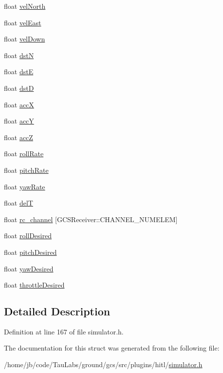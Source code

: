 \begin{DoxyCompactItemize}
\item 
float \hyperlink{group___h_i_t_l_plugin_gaa20e34957a2badaea5d07a49ab029182}{vel\-North}
\item 
float \hyperlink{group___h_i_t_l_plugin_gae7889fb60f991558b83af5aef685a35f}{vel\-East}
\item 
float \hyperlink{group___h_i_t_l_plugin_ga9d5ac871d0c0845dcd9363069268c2d3}{vel\-Down}
\item 
float \hyperlink{group___h_i_t_l_plugin_gad276a9a114b2d57a5c4536e9ef0a9a12}{dst\-N}
\item 
float \hyperlink{group___h_i_t_l_plugin_ga5d4746c1f8dd9251dd5b37ced82d4a93}{dst\-E}
\item 
float \hyperlink{group___h_i_t_l_plugin_gaf1362ebbee3efc97a9c205aaffdeb98a}{dst\-D}
\item 
float \hyperlink{group___h_i_t_l_plugin_gaf15a299d1ff6f64a04c72d9ef5bf3860}{acc\-X}
\item 
float \hyperlink{group___h_i_t_l_plugin_ga3ce16295c4d5bfc0a4938f0120d946c4}{acc\-Y}
\item 
float \hyperlink{group___h_i_t_l_plugin_ga8565b780814dd8fddf28e4018256356a}{acc\-Z}
\item 
float \hyperlink{group___h_i_t_l_plugin_ga81680dc2663395de5b3f4aeaeb9f35f9}{roll\-Rate}
\item 
float \hyperlink{group___h_i_t_l_plugin_ga9d3248d73390ba0b13ca165ee1f1fef0}{pitch\-Rate}
\item 
float \hyperlink{group___h_i_t_l_plugin_gab54300de73ca6f11f519068435673210}{yaw\-Rate}
\item 
float \hyperlink{group___h_i_t_l_plugin_gadbdb09f62a5ce0e914e8551ce3bd0bbd}{del\-T}
\item 
float \hyperlink{group___h_i_t_l_plugin_gadf58977eef899196280267ae39cc6f65}{rc\-\_\-channel} \mbox{[}\-G\-C\-S\-Receiver\-::\-C\-H\-A\-N\-N\-E\-L\-\_\-\-N\-U\-M\-E\-L\-E\-M\mbox{]}
\item 
float \hyperlink{group___h_i_t_l_plugin_ga56fde0222228b19a5ed9e89efd765da0}{roll\-Desired}
\item 
float \hyperlink{group___h_i_t_l_plugin_ga29bbb9f720db0b7039f92a3afcb785a3}{pitch\-Desired}
\item 
float \hyperlink{group___h_i_t_l_plugin_gaf01c33ffb5c7695348739d0070122bd7}{yaw\-Desired}
\item 
float \hyperlink{group___h_i_t_l_plugin_gab6902f4f38e771b9d499521d861661f2}{throttle\-Desired}
\end{DoxyCompactItemize}


\subsection{\-Detailed \-Description}


\-Definition at line 167 of file simulator.\-h.



\-The documentation for this struct was generated from the following file\-:\begin{DoxyCompactItemize}
\item 
/home/jb/code/\-Tau\-Labs/ground/gcs/src/plugins/hitl/\hyperlink{simulator_8h}{simulator.\-h}\end{DoxyCompactItemize}
